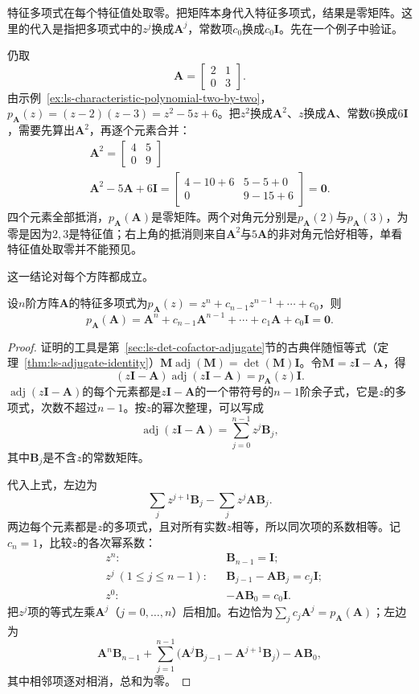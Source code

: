 特征多项式在每个特征值处取零。把矩阵本身代入特征多项式，结果是零矩阵。这里的代入是指把多项式中的$z^j$换成$\bm A^j$，常数项$c_0$换成$c_0\bm I$。先在一个例子中验证。
\begin{example}[把矩阵代入它的特征多项式]
\label{ex:ls-cayley-hamilton-two-by-two}
仍取
\[
 \bm A=\begin{bmatrix}2&1\\0&3\end{bmatrix}.
\]
由示例~\ref{ex:ls-characteristic-polynomial-two-by-two}，$p_{\bm A}(z)=(z-2)(z-3)=z^2-5z+6$。把$z^2$换成$\bm A^2$、$z$换成$\bm A$、常数$6$换成$6\bm I$，需要先算出$\bm A^2$，再逐个元素合并：
\[
\begin{gathered}
\bm A^2=\begin{bmatrix}4&5\\0&9\end{bmatrix}\\
\bm A^2-5\bm A+6\bm I
 =\begin{bmatrix}4-10+6&5-5+0\\0&9-15+6\end{bmatrix}
 =\bm0 .
\end{gathered}
\]
四个元素全部抵消，$p_{\bm A}(\bm A)$是零矩阵。两个对角元分别是$p_{\bm A}(2)$与$p_{\bm A}(3)$，为零是因为$2,3$是特征值；右上角的抵消则来自$\bm A^2$与$5\bm A$的非对角元恰好相等，单看特征值处取零并不能预见。
\end{example}
这一结论对每个方阵都成立。
\begin{theorem}
\label{thm:ls-cayley-hamilton}
设$n$阶方阵$\bm A$的特征多项式为$p_{\bm A}(z)=z^n+c_{n-1}z^{n-1}+\cdots+c_0$，则
\begin{equation}
 p_{\bm A}(\bm A)
 =\bm A^n+c_{n-1}\bm A^{n-1}+\cdots+c_1\bm A+c_0\bm I=\bm0.
 \label{eq:ls-cayley-hamilton}
\end{equation}
\end{theorem}
\begin{proof}
证明的工具是第~\ref{sec:ls-det-cofactor-adjugate}节的古典伴随恒等式（定理~\ref{thm:ls-adjugate-identity}）$\bm M\operatorname{adj}(\bm M)=\det(\bm M)\bm I$。令$\bm M=z\bm I-\bm A$，得
\[
 (z\bm I-\bm A)\operatorname{adj}(z\bm I-\bm A)=p_{\bm A}(z)\bm I .
\]
$\operatorname{adj}(z\bm I-\bm A)$的每个元素都是$z\bm I-\bm A$的一个带符号的$n-1$阶余子式，它是$z$的多项式，次数不超过$n-1$。按$z$的幂次整理，可以写成
\[
 \operatorname{adj}(z\bm I-\bm A)=\sum_{j=0}^{n-1}z^j\bm B_j,
\]
其中$\bm B_j$是不含$z$的常数矩阵。

代入上式，左边为
\[
 \sum_jz^{j+1}\bm B_j-\sum_jz^j\bm A\bm B_j .
\]
两边每个元素都是$z$的多项式，且对所有实数$z$相等，所以同次项的系数相等。记$c_n=1$，比较$z$的各次幂系数：
\[
 \begin{aligned}
 &z^n: &&\bm B_{n-1}=\bm I;\\
 &z^j\ (1\leq j\leq n-1): &&\bm B_{j-1}-\bm A\bm B_j=c_j\bm I;\\
 &z^0: &&-\bm A\bm B_0=c_0\bm I .
 \end{aligned}
\]
把$z^j$项的等式左乘$\bm A^j$（$j=0,\ldots,n$）后相加。右边恰为$\sum_jc_j\bm A^j=p_{\bm A}(\bm A)$；左边为
\[
 \bm A^n\bm B_{n-1}+\sum_{j=1}^{n-1}\bigl(\bm A^j\bm B_{j-1}-\bm A^{j+1}\bm B_j\bigr)-\bm A\bm B_0 ,
\]
其中相邻项逐对相消，总和为零。
\end{proof}
